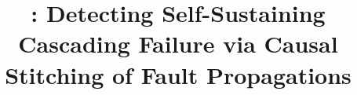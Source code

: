 \documentclass[sigplan, screen, authorversion, 10pt]{acmart}
\begin{document}



\title[Detecting Self-Sustaining Cascading Failure via Causal Stitching]{\tool: 
Detecting 
Self-Sustaining 
Cascading Failure 
via Causal Stitching of Fault Propagations
}




\maketitle
















\clearpage





\clearpage


\end{document}
